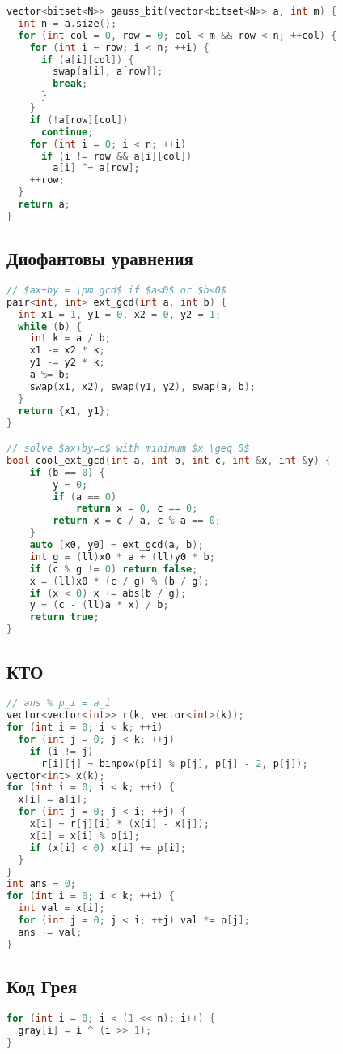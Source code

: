 \documentclass[9pt,a4paper,landscape,twosided]{extarticle}
\begin{document}
\begin{multicols*}{3}
\begin{lstlisting}[language=C++]
vector<bitset<N>> gauss_bit(vector<bitset<N>> a, int m) {
  int n = a.size();
  for (int col = 0, row = 0; col < m && row < n; ++col) {
    for (int i = row; i < n; ++i) {
      if (a[i][col]) {
        swap(a[i], a[row]);
        break;
      }
    }
    if (!a[row][col])
      continue;
    for (int i = 0; i < n; ++i)
      if (i != row && a[i][col])
        a[i] ^= a[row];
    ++row;
  }
  return a;
}
\end{lstlisting}

\subsection{Диофантовы уравнения}
\begin{lstlisting}[language=C++]
// $ax+by = \pm gcd$ if $a<0$ or $b<0$
pair<int, int> ext_gcd(int a, int b) {
  int x1 = 1, y1 = 0, x2 = 0, y2 = 1;
  while (b) {
    int k = a / b;
    x1 -= x2 * k;
    y1 -= y2 * k;
    a %= b;
    swap(x1, x2), swap(y1, y2), swap(a, b);
  }
  return {x1, y1};
}

// solve $ax+by=c$ with minimum $x \geq 0$
bool cool_ext_gcd(int a, int b, int c, int &x, int &y) {
    if (b == 0) {
        y = 0;
        if (a == 0)
            return x = 0, c == 0;
        return x = c / a, c % a == 0;
    }
    auto [x0, y0] = ext_gcd(a, b);
    int g = (ll)x0 * a + (ll)y0 * b;
    if (c % g != 0) return false;
    x = (ll)x0 * (c / g) % (b / g);
    if (x < 0) x += abs(b / g);
    y = (c - (ll)a * x) / b;
    return true;
}
\end{lstlisting}

\subsection{КТО}
\begin{lstlisting}[language=C++]
// ans % p_i = a_i
vector<vector<int>> r(k, vector<int>(k));
for (int i = 0; i < k; ++i)
  for (int j = 0; j < k; ++j)
    if (i != j)
      r[i][j] = binpow(p[i] % p[j], p[j] - 2, p[j]);
vector<int> x(k);
for (int i = 0; i < k; ++i) {
  x[i] = a[i];
  for (int j = 0; j < i; ++j) {
    x[i] = r[j][i] * (x[i] - x[j]);
    x[i] = x[i] % p[i];
    if (x[i] < 0) x[i] += p[i];
  }
}
int ans = 0;
for (int i = 0; i < k; ++i) {
  int val = x[i];
  for (int j = 0; j < i; ++j) val *= p[j];
  ans += val;
}
\end{lstlisting}

\subsection{Код Грея}
\begin{lstlisting}[language=C++]
for (int i = 0; i < (1 << n); i++) {
  gray[i] = i ^ (i >> 1);
}
\end{lstlisting}


\end{multicols*}
\end{document}

